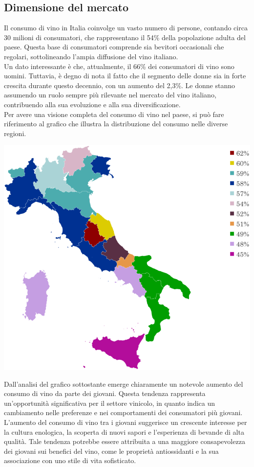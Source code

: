 \documentclass[12pt, a4paper]{article}
\newcommand{\meskip}{\medskip \\}
\begin{document}
\subsection{Dimensione del mercato}
Il consumo di vino in Italia coinvolge un vasto numero di persone, contando circa 30 milioni di consumatori, che rappresentano il 54\% della popolazione adulta del paese. Questa base di consumatori comprende sia bevitori occasionali che regolari, sottolineando l'ampia diffusione del vino italiano.\\
Un dato interessante è che, attualmente, il 66\% dei consumatori di vino sono uomini. Tuttavia, è degno di nota il fatto che il segmento delle donne sia in forte crescita durante questo decennio, con un aumento del 2,3\%. Le donne stanno assumendo un ruolo sempre più rilevante nel mercato del vino italiano, contribuendo alla sua evoluzione e alla sua diversificazione.\\
Per avere una visione completa del consumo di vino nel paese, si può fare riferimento al grafico che illustra la distribuzione del consumo nelle diverse regioni.
\begin{center}
    \includegraphics[width=.62\textwidth]{images/grafico_consumatori_regioni.png}
\end{center}
\noindent Dall'analisi del grafico sottostante emerge chiaramente un notevole aumento del consumo di vino da parte dei giovani. Questa tendenza rappresenta un'opportunità significativa per il settore vinicolo, in quanto indica un cambiamento nelle preferenze e nei comportamenti dei consumatori più giovani.\meskip
L'aumento del consumo di vino tra i giovani suggerisce un crescente interesse per la cultura enologica, la scoperta di nuovi sapori e l'esperienza di bevande di alta qualità. Tale tendenza potrebbe essere attribuita a una maggiore consapevolezza dei giovani sui benefici del vino, come le proprietà antiossidanti e la sua associazione con uno stile di vita sofisticato.\meskip
\end{document}

